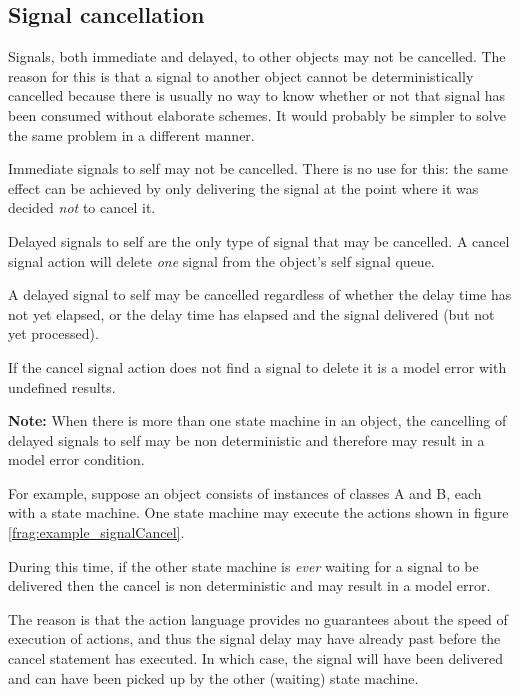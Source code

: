 \subsection{Signal cancellation}

Signals, both immediate and delayed, to other objects may not be cancelled. The
reason for this is that a signal to another object cannot be deterministically
cancelled because there is usually no way to know whether or not that signal
has been consumed without elaborate schemes. It would probably be simpler to
solve the same problem in a different manner.

Immediate signals to self may not be cancelled. There is no use for this: the
same effect can be achieved by only delivering the signal at the point where
it was decided \emph{not} to cancel it.

Delayed signals to self are the only type of signal that may be cancelled.
A cancel signal action will delete \emph{one} signal from the object's
\textsf{self} signal queue.


A delayed signal to self may be cancelled regardless of whether the delay
time has not yet elapsed, or the delay time has elapsed and the signal
delivered (but not yet processed).

If the cancel signal action does not find a signal to delete it is a model
error with undefined results.

\textbf{Note:} When there is more than one state machine in an object, the
cancelling of delayed signals to self may be non deterministic and therefore
may result in a model error condition.


For example, suppose an object consists of instances of classes A and B, each
with a state machine. One state machine may execute the actions shown in figure
\ref{frag:example_signalCancel}.


During this time, if the other state machine is \emph{ever} waiting for a
signal to be delivered then the cancel is non deterministic and may result in
a model error.

The reason is that the action language provides no guarantees about the
speed of execution of actions, and thus the signal delay may have already
past before the cancel statement has executed. In which case, the signal
will have been delivered and can have been picked up by the other (waiting)
state machine.

